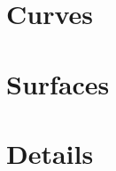 \documentclass[twoside]{book}
\begin{document}


\part{Curves}






\part{Surfaces}


   

%
%

%




\part{Details}


\appendix





\sloppy
\printbibliography[heading=bibintoc]
\fussy
\end{document}
